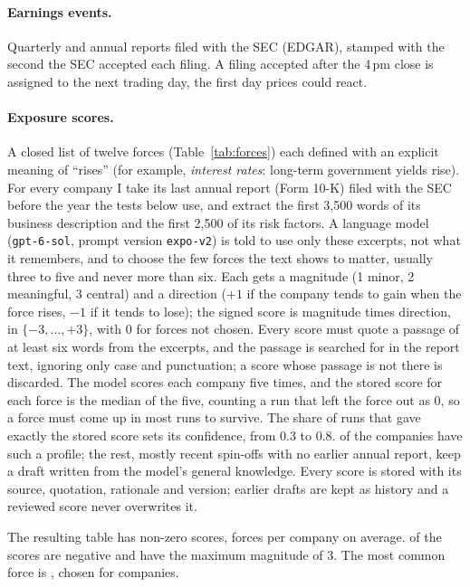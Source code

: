 \documentclass[11pt]{article}
\begin{document}
\paragraph{Earnings events.} Quarterly and annual reports filed with the SEC (EDGAR), stamped with the second the SEC accepted each filing. A filing accepted after the 4\,pm close is assigned to the next trading day, the first day prices could react.

\paragraph{Exposure scores.} A closed list of twelve forces (Table~\ref{tab:forces}) each defined with an explicit meaning of ``rises'' (for example, \emph{interest rates}: long-term government yields rise). For every company I take its last annual report (Form 10-K) filed with the SEC before the year the tests below use, and extract the first 3{,}500 words of its business description and the first 2{,}500 of its risk factors. A language model (\texttt{gpt-6-sol}, prompt version \texttt{expo-v2}) is told to use only these excerpts, not what it remembers, and to choose the few forces the text shows to matter, usually three to five and never more than six. Each gets a magnitude (1 minor, 2 meaningful, 3 central) and a direction ($+1$ if the company tends to gain when the force rises, $-1$ if it tends to lose); the signed score is magnitude times direction, in $\{-3,\dots,+3\}$, with 0 for forces not chosen. Every score must quote a passage of at least six words from the excerpts, and the passage is searched for in the report text, ignoring only case and punctuation; a score whose passage is not there is discarded. The model scores each company five times, and the stored score for each force is the median of the five, counting a run that left the force out as 0, so a force must come up in most runs to survive. The share of runs that gave exactly the stored score sets its confidence, from 0.3 to 0.8. \nGrounded{} of the \nProfiled{} companies have such a profile; the rest, mostly recent spin-offs with no earlier annual report, keep a draft written from the model's general knowledge. Every score is stored with its source, quotation, rationale and version; earlier drafts are kept as history and a reviewed score never overwrites it.

The resulting table has \nExposureRows{} non-zero scores, \forcesPerCompany{} forces per company on average. \shareNegative{} of the scores are negative and \shareStrong{} have the maximum magnitude of 3. The most common force is \topForce, chosen for \topForceCompanies{} companies.
\end{document}
